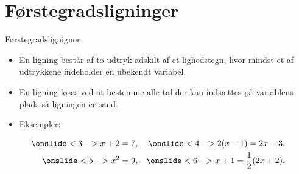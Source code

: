 \section{Førstegradsligninger}
\begin{frame}{Førstegradslignigner}
\begin{itemize}
		\setlength\itemsep{1em}
	\item<1-> En ligning består af to udtryk adskilt af et lighedstegn, hvor mindst et af udtrykkene indeholder en ubekendt variabel.
	\item<2-> En ligning løses ved at bestemme alle tal der kan indsættes på variablens plads så ligningen er sand.
	\item<3-> Eksempler:
\end{itemize}
	\begin{align*}
\onslide<3->{x+2=7,}&& \onslide<4->{2(x-1)=2x+3,}\\ \onslide<5->{x^2=9,}&&\onslide<6->{ x+1=\frac{1}{2}(2x+2).}
\end{align*}
\end{frame}

